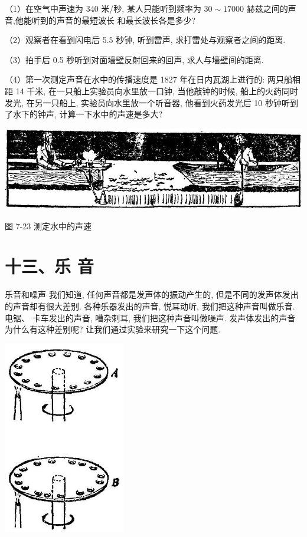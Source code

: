 \documentclass[10pt]{article}
\begin{document}
（1）在空气中声速为 340 米/秒, 某人只能听到频率为 \({30} \sim {17000}\) 赫兹之间的声音,他能听到的声音的最短波长 和最长波长各是多少?

（2）观察者在看到闪电后 5.5 秒钟, 听到雷声, 求打雷处与观察者之间的距离.

（3）拍手后 0.5 秒听到对面墙壁反射回来的回声, 求人与墙壁间的距离.

（4）第一次测定声音在水中的传播速度是 1827 年在日内瓦湖上进行的: 两只船相距 14 千米, 在一只船上实验员向水里放一口钟, 当他敲钟的时候, 船上的火药同时发光, 在另一只船上, 实验员向水里放一个听音器, 他看到火药发光后 10 秒钟听到了水下的钟声, 计算一下水中的声速是多大?

\begin{center}
\includegraphics[max width=1.0\textwidth]{images/01912d55-147c-70aa-b0e0-1782a122f948_220_529179.jpg}
\end{center}

图 7-23 测定水中的声速

\section*{十三、乐 音}

乐音和噪声 我们知道, 任何声音都是发声体的振动产生的, 但是不同的发声体发出的声音却有很大差别. 各种乐器发出的声音, 悦耳动听, 我们把这种声音叫做乐音. 电锯、 卡车发出的声音, 嘈杂刺耳, 我们把这种声音叫做噪声. 发声体发出的声音为什么有这种差别呢? 让我们通过实验来研究一下这个问题.

\begin{center}
\includegraphics[max width=0.4\textwidth]{images/01912d55-147c-70aa-b0e0-1782a122f948_221_792402.jpg}
\end{center}
\end{document}
